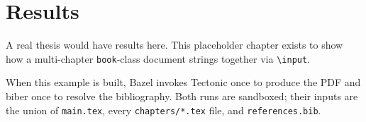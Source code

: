 \chapter{Results}
\label{ch:results}

A real thesis would have results here. This placeholder chapter
exists to show how a multi-chapter \texttt{book}-class document
strings together via \texttt{\textbackslash input}.

When this example is built, Bazel invokes Tectonic once to produce
the PDF and biber once to resolve the bibliography. Both runs are
sandboxed; their inputs are the union of \texttt{main.tex}, every
\texttt{chapters/*.tex} file, and \texttt{references.bib}.
